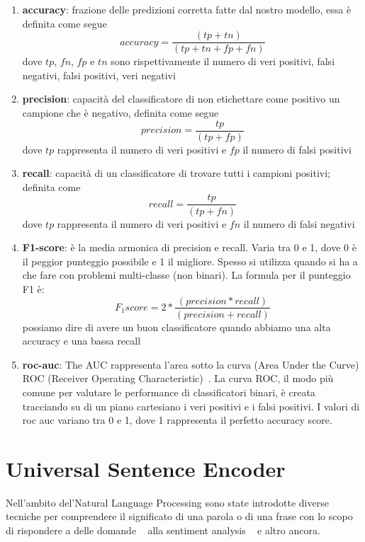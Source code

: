 \begin{enumerate}
    \item \textbf{accuracy}: frazione delle predizioni corretta fatte dal nostro modello, essa è definita come segue
    \begin{equation*} accuracy = \dfrac {(tp + tn)}{(tp + tn + fp + fn)}\end{equation*} 
    dove $tp$, $fn$, $fp$ e $tn$ sono rispettivamente il numero di veri positivi, falsi negativi, falsi positivi, veri negativi
    
    \item \textbf{precision}: capacità del classificatore di non etichettare come positivo un campione che è negativo, definita come segue
    \begin{equation*} precision = \dfrac {tp}{(tp + fp)}\end{equation*} 
    dove $tp$ rappresenta il numero di veri positivi e $fp$ il numero di falsi positivi
    
    \item \textbf{recall}: capacità di un classificatore di trovare tutti i campioni positivi; definita come
    \begin{equation*} recall = \dfrac {tp}{(tp + fn)}\end{equation*} 
    dove $tp$ rappresenta il numero di veri positivi e $fn$ il numero di falsi negativi
    
    \item \textbf{F1-score}: è la media armonica di precision e recall. Varia tra 0 e 1, dove 0 è il peggior punteggio possibile e 1 il migliore. Spesso si utilizza quando si ha a che fare con problemi multi-classe (non binari). La formula per il punteggio F1 è:
    \begin{equation}
       F_1score = 2 * \frac{(precision * recall)}{(precision + recall)}
    \end{equation}
    possiamo dire di avere un buon classificatore quando abbiamo una alta accuracy e una bassa recall
    \item \textbf{roc-auc}: The AUC rappresenta l'area sotto la curva (Area Under the Curve) ROC (Receiver Operating Characteristic)~\cite{RocAUC}. La curva ROC, il modo più comune per valutare le performance di classificatori binari, è creata tracciando su di un piano cartesiano i veri positivi e i falsi positivi. I valori di roc auc variano tra 0 e 1, dove 1 rappresenta il perfetto accuracy score.
\end{enumerate}

\section{Universal Sentence Encoder}
\label{ssec:use}
Nell'ambito del'Natural Language Processing sono state introdotte diverse tecniche per comprendere il significato di una parola o di una frase con lo scopo di rispondere a delle domande ~\cite{wu2017visual} alla sentiment analysis ~\cite{kaur2017survey} e altro ancora.


